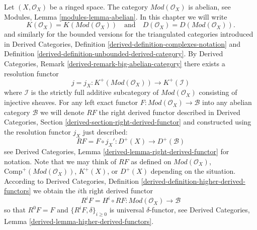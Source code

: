 \medskip\noindent
Let $(X, \mathcal{O}_X)$ be a ringed space. The category
$\textit{Mod}(\mathcal{O}_X)$ is abelian, see
Modules, Lemma \ref{modules-lemma-abelian}.
In this chapter we will write
$$
K(\mathcal{O}_X) = K(\textit{Mod}(\mathcal{O}_X))
\quad
\text{and}
\quad
D(\mathcal{O}_X) = D(\textit{Mod}(\mathcal{O}_X)).
$$
and similarly for the bounded versions for the triangulated categories
introduced in
Derived Categories, Definition \ref{derived-definition-complexes-notation} and
Definition \ref{derived-definition-unbounded-derived-category}.
By
Derived Categories, Remark \ref{derived-remark-big-abelian-category}
there exists a resolution functor
$$
j = j_X :
K^{+}(\textit{Mod}(\mathcal{O}_X))
\longrightarrow
K^{+}(\mathcal{I})
$$
where $\mathcal{I}$ is the strictly full additive subcategory of
$\textit{Mod}(\mathcal{O}_X)$ consisting of injective sheaves.
For any left exact functor
$F : \textit{Mod}(\mathcal{O}_X) \to \mathcal{B}$
into any abelian category $\mathcal{B}$ we will denote $RF$ the
right derived functor described in
Derived Categories, Section \ref{derived-section-right-derived-functor}
and constructed using the resolution functor $j_X$ just described:
\begin{equation}
\label{equation-RF}
RF = F \circ j_X' : D^{+}(X) \longrightarrow D^{+}(\mathcal{B})
\end{equation}
see
Derived Categories, Lemma \ref{derived-lemma-right-derived-functor}
for notation. Note that we may think of $RF$ as defined on
$\textit{Mod}(\mathcal{O}_X)$,
$\text{Comp}^{+}(\textit{Mod}(\mathcal{O}_X))$,
$K^{+}(X)$, or $D^{+}(X)$
depending on the situation. According to
Derived Categories, Definition \ref{derived-definition-higher-derived-functors}
we obtain the $i$th right derived functor
\begin{equation}
\label{equation-RFi}
R^iF = H^i \circ RF : \textit{Mod}(\mathcal{O}_X) \longrightarrow \mathcal{B}
\end{equation}
so that $R^0F = F$ and $\{R^iF, \delta\}_{i \geq 0}$ is universal
$\delta$-functor, see
Derived Categories, Lemma \ref{derived-lemma-higher-derived-functors}.

